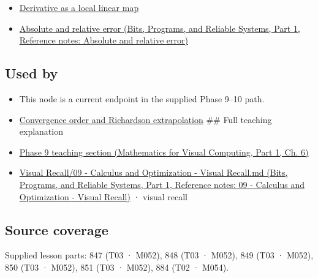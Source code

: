 \begin{itemize}
\tightlist
\item
  \hyperref[appendix-7bc181935c42]{Derivative as a local linear map}
\item
  \href{../01-Bits-Programs-and-Reliable-Systems-P01/main.pdf\#appendix-3ae74e89b4e6}{Absolute and relative error (Bits, Programs, and Reliable Systems, Part 1, Reference notes: Absolute and relative error)}
\end{itemize}

\subsection{Used by}\label{appendix-e2d7b4f2161d-used-by}

\hypertarget{appendix-e2d7b4f2161d-used-by}{}

\begin{itemize}
\item
  This node is a current endpoint in the supplied Phase 9--10 path.
\item
  \hyperref[appendix-aca80b6bf17a]{Convergence order and Richardson extrapolation} \#\# Full teaching explanation
\item
  \href{../02-Mathematics-for-Visual-Computing-P01/main.pdf\#02-foundations-ii-ch022-numerical-differentiation-and-automatic-differentiation}{Phase 9 teaching section (Mathematics for Visual Computing, Part 1, Ch. 6)}
\item
  \href{../01-Bits-Programs-and-Reliable-Systems-P01/main.pdf\#appendix-adf48f5dc5c1}{Visual Recall/09 - Calculus and Optimization - Visual Recall.md (Bits, Programs, and Reliable Systems, Part 1, Reference notes: 09 - Calculus and Optimization - Visual Recall)} · visual recall
\end{itemize}

\subsection{Source coverage}\label{appendix-e2d7b4f2161d-source-coverage}

\hypertarget{appendix-e2d7b4f2161d-source-coverage}{}

Supplied lesson parts: 847 (T03 · M052), 848 (T03 · M052), 849 (T03 · M052), 850 (T03 · M052), 851 (T03 · M052), 884 (T02 · M054).
